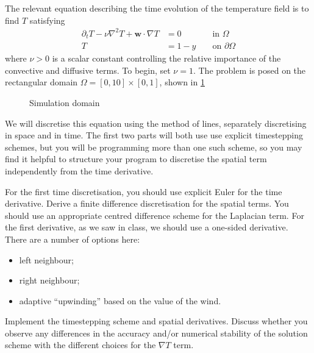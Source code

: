 \documentclass[11pt,a4paper]{article}
\renewcommand{\vec}[1]{\ensuremath{\mathbf{#1}}}
\begin{document}
The relevant equation describing the time evolution of the temperature
field is to find $T$ satisfying
\begin{equation}
  \label{eq:1}
  \begin{aligned}
  \partial_t T - \nu \nabla^2 T + \vec{w} \cdot \nabla T &= 0 &&\text{ in } \Omega\\
  T &= 1 - y &&\text{ on } \partial\Omega
  \end{aligned}
\end{equation}
where $\nu > 0$ is a scalar constant controlling the relative
importance of the convective and diffusive terms. To begin, set
$\nu = 1$. The problem is posed on the rectangular domain
$\Omega = [0, 10] \times [0, 1]$, shown in \cref{fig:omega}
\begin{figure}[htbp]
  \centering
  \caption{Simulation domain}
  \label{fig:omega}
\end{figure}


We will discretise this equation using the method of lines, separately
discretising in space and in time. The first two parts will both use
use explicit timestepping schemes, but you will be programming more
than one such scheme, so you may find it helpful to structure your
program to discretise the spatial term independently from the time
derivative.

For the first time discretisation, you should use explicit Euler for
the time derivative. Derive a finite difference discretisation for the
spatial terms. You should use an appropriate centred difference scheme
for the Laplacian term. For the first derivative, as we saw in class,
we should use a one-sided derivative. There are a number of options
here:
\begin{itemize}
\item left neighbour;
\item right neighbour;
\item adaptive ``upwinding'' based on the value of the wind.
\end{itemize}
Implement the timestepping scheme and spatial derivatives. Discuss
whether you observe any differences in the accuracy and/or numerical
stability of the solution scheme with the different choices for the
$\nabla T$ term.
\end{document}
